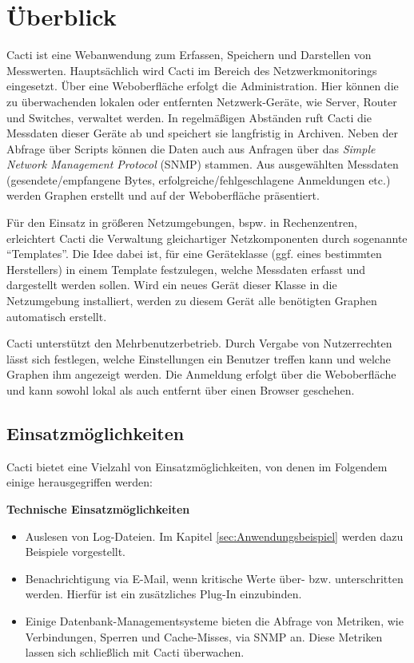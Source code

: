 \documentclass[12pt,ngerman,toc=listofnumbered,toc=bibliographynumbered,toc=index,headsepline=true]{scrbook}
\begin{document}
\chapter{Überblick}
Cacti ist eine Webanwendung zum Erfassen, Speichern und Darstellen von
Messwerten. Hauptsächlich wird Cacti im Bereich des Netzwerkmonitorings
eingesetzt. Über eine Weboberfläche erfolgt die Administration. Hier können die
zu überwachenden lokalen oder entfernten Netzwerk-Geräte, wie Server, Router und
Switches, verwaltet werden. In regelmäßigen Abständen ruft Cacti die Messdaten
dieser Geräte ab und speichert sie langfristig in Archiven. Neben der Abfrage
über Scripts können die Daten auch aus Anfragen über das \textit{Simple Network
Management Protocol} (SNMP) stammen. Aus ausgewählten Messdaten
(gesendete/empfangene Bytes, erfolgreiche/fehlgeschlagene Anmeldungen etc.)
werden Graphen erstellt und auf der Weboberfläche präsentiert.

Für den Einsatz in größeren Netzumgebungen, bspw. in Rechenzentren, erleichtert
Cacti die Verwaltung gleichartiger Netzkomponenten durch sogenannte
\enquote{Templates}. Die Idee dabei ist, für eine Geräteklasse (ggf. eines
bestimmten Herstellers) in einem Template festzulegen, welche Messdaten erfasst
und dargestellt werden sollen. Wird ein neues Gerät dieser Klasse in die
Netzumgebung installiert, werden zu diesem Gerät alle benötigten Graphen
automatisch erstellt.

Cacti unterstützt den Mehrbenutzerbetrieb. Durch Vergabe von Nutzerrechten lässt
sich festlegen, welche Einstellungen ein Benutzer treffen kann und welche
Graphen ihm angezeigt werden. Die Anmeldung erfolgt über die Weboberfläche und
kann sowohl lokal als auch entfernt über einen Browser geschehen.

\section{Einsatzmöglichkeiten}
Cacti bietet eine Vielzahl von Einsatzmöglichkeiten, von denen im Folgendem
einige herausgegriffen werden:

\textbf{Technische Einsatzmöglichkeiten}
\begin{itemize}
  \item Auslesen von Log-Dateien. Im Kapitel \ref{sec:Anwendungsbeispiel} werden
  dazu Beispiele vorgestellt.
  \item Benachrichtigung via E-Mail, wenn kritische Werte über- bzw.
  unterschritten werden. Hierfür ist ein zusätzliches Plug-In einzubinden.
  \item Einige Datenbank-Managementsysteme bieten die Abfrage von Metriken, wie
  Verbindungen, Sperren und Cache-Misses, via SNMP an. Diese Metriken lassen
  sich schließlich mit Cacti überwachen.
\end{itemize}
\end{document}

